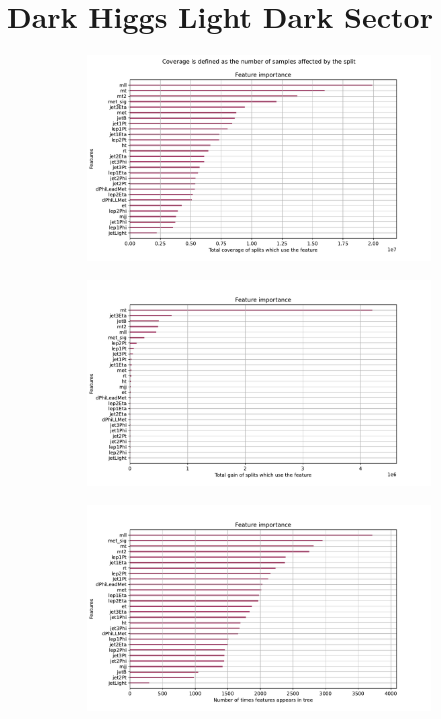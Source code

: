 \documentclass[12pt, a4paper]{book}
\begin{document}
\section{Dark Higgs Light Dark Sector}
\begin{figure}[!ht]
	\centering
	\begin{subfigure}[b]{0.7\textwidth}
      \centering
      \includegraphics[width=1\textwidth]{XGBoost/DH_LDS/feature_importance/total_cover.pdf}
      \end{subfigure}
      \hfill
      \begin{subfigure}[b]{0.7\textwidth}
         \centering
         \includegraphics[width=1\textwidth]{XGBoost/DH_LDS/feature_importance/total_gain.pdf}
      \end{subfigure}
      \hfill
      \begin{subfigure}[b]{0.7\textwidth}
         \centering
         \includegraphics[width=1\textwidth]{XGBoost/DH_LDS/feature_importance/weight.pdf}

\end{subfigure}
\end{figure}
\end{document}
